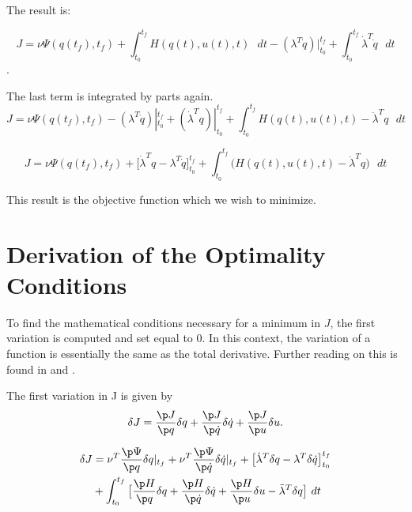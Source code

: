 The result is:

\begin{equation}
    J = \nu \Psi ( q(t_f),t_f ) + \int_{t_0}^{t_f}  H(q(t),u(t),t) \text{  } dt -(\lambda^T \dot q) |_{t_0}^{t_f} + \int_{t_0}^{t_f} \dot \lambda^T  \dot q\text{  } dt
\end{equation}.


The last term is integrated by parts again.\\

\begin{equation}
    J = \nu \Psi ( q(t_f),t_f ) - (\lambda^T \dot q)|_{t_0}^{t_f} + (\dot \lambda^T  q)|_{t_0}^{t_f} + \int_{t_0}^{t_f}  H(q(t),u(t),t) - \ddot \lambda^T q \text{  }dt
\end{equation}

\begin{equation}
    J = \nu \Psi ( q(t_f),t_f )  + \big[ \dot \lambda^T q - \lambda^T \dot q\big]_{t_0}^{t_f} + \int_{t_0}^{t_f}  \big( H(q(t),u(t),t) - \ddot \lambda^T q \big) \text{  } dt
\end{equation}




This result is the objective function which we wish to minimize.


\section{Derivation of the Optimality Conditions}


 To find the mathematical conditions necessary for a minimum in $J$, the first variation is computed and set equal to 0. In this context, the variation of a function is essentially the same as the total derivative. Further reading on this is found in \cite{marion1995classical} and  \cite{cornelius1970variational}.


The first variation in J is given by\\

\begin{equation}
    \delta  J = \frac{\p J}{\p q} \delta q + \frac{\p J}{\p \dot q} \delta \dot q   +  \frac{\p J}{\p u} \delta u.
\end{equation}


\begin{equation}
\begin{split}
    \delta  J &= \nu^T \frac{\p \Psi}{\p q}\delta q |_{t_f}
                 + \nu^T \frac{\p \Psi}{\p \dot q}\delta \dot q |_{t_f}
                 + \big[ \dot \lambda^T \delta q - \lambda^T  \delta \dot q\big]_{t_0}^{t_f}\\
               &+ \int_{t_0}^{t_f}  \big[ \frac{\p H}{\p q}\delta q +
                                           \frac{\p H}{\p \dot q}\delta \dot q 
                                           + \frac{\p H}{\p u}\delta u 
                                           - \ddot \lambda^T  \delta q  \big]   \text{  } dt\\
\end{split}    
\end{equation}
 

